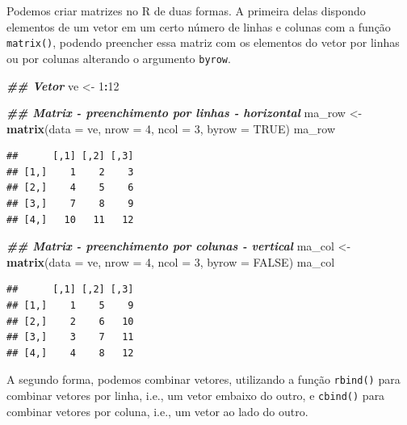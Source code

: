 \documentclass[
]{article}
\newenvironment{Shaded}{\begin{snugshade}}{\end{snugshade}}
\newcommand{\AttributeTok}[1]{\textcolor[rgb]{0.13,0.29,0.53}{#1}}
\newcommand{\ConstantTok}[1]{\textcolor[rgb]{0.56,0.35,0.01}{#1}}
\newcommand{\DecValTok}[1]{\textcolor[rgb]{0.00,0.00,0.81}{#1}}
\newcommand{\DocumentationTok}[1]{\textcolor[rgb]{0.56,0.35,0.01}{\textbf{\textit{#1}}}}
\newcommand{\FunctionTok}[1]{\textcolor[rgb]{0.13,0.29,0.53}{\textbf{#1}}}
\newcommand{\NormalTok}[1]{#1}
\newcommand{\OtherTok}[1]{\textcolor[rgb]{0.56,0.35,0.01}{#1}}
\newcommand{\SpecialCharTok}[1]{\textcolor[rgb]{0.81,0.36,0.00}{\textbf{#1}}}
\begin{document}
Podemos criar matrizes no R de duas formas. A primeira delas dispondo elementos de um vetor em um certo número de linhas e colunas com a função \texttt{matrix()}, podendo preencher essa matriz com os elementos do vetor por linhas ou por colunas alterando o argumento \texttt{byrow}.

\begin{Shaded}
\begin{Highlighting}[]
\DocumentationTok{\#\# Vetor}
\NormalTok{ve }\OtherTok{\textless{}{-}} \DecValTok{1}\SpecialCharTok{:}\DecValTok{12}

\DocumentationTok{\#\# Matrix {-} preenchimento por linhas {-} horizontal}
\NormalTok{ma\_row }\OtherTok{\textless{}{-}} \FunctionTok{matrix}\NormalTok{(}\AttributeTok{data =}\NormalTok{ ve, }\AttributeTok{nrow =} \DecValTok{4}\NormalTok{, }\AttributeTok{ncol =} \DecValTok{3}\NormalTok{, }\AttributeTok{byrow =} \ConstantTok{TRUE}\NormalTok{)}
\NormalTok{ma\_row}
\end{Highlighting}
\end{Shaded}

\begin{verbatim}
##      [,1] [,2] [,3]
## [1,]    1    2    3
## [2,]    4    5    6
## [3,]    7    8    9
## [4,]   10   11   12
\end{verbatim}

\begin{Shaded}
\begin{Highlighting}[]
\DocumentationTok{\#\# Matrix {-} preenchimento por colunas {-} vertical}
\NormalTok{ma\_col }\OtherTok{\textless{}{-}} \FunctionTok{matrix}\NormalTok{(}\AttributeTok{data =}\NormalTok{ ve, }\AttributeTok{nrow =} \DecValTok{4}\NormalTok{, }\AttributeTok{ncol =} \DecValTok{3}\NormalTok{, }\AttributeTok{byrow =} \ConstantTok{FALSE}\NormalTok{)}
\NormalTok{ma\_col}
\end{Highlighting}
\end{Shaded}

\begin{verbatim}
##      [,1] [,2] [,3]
## [1,]    1    5    9
## [2,]    2    6   10
## [3,]    3    7   11
## [4,]    4    8   12
\end{verbatim}

A segundo forma, podemos combinar vetores, utilizando a função \texttt{rbind()} para combinar vetores por linha, i.e., um vetor embaixo do outro, e \texttt{cbind()} para combinar vetores por coluna, i.e., um vetor ao lado do outro.
\end{document}
